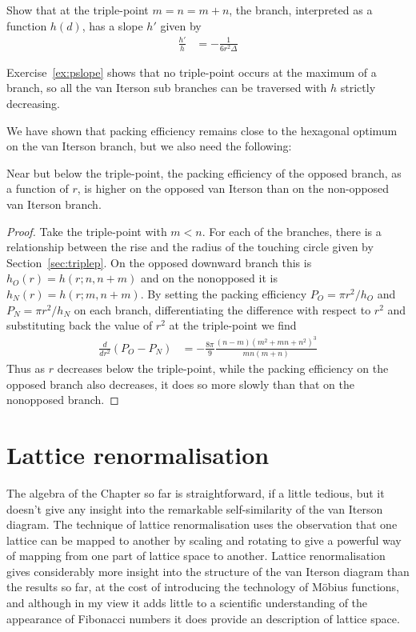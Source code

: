 \begin{jExercise}\label{ex:pslope}
	Show that at the triple-point  $m=n=m+n$, the  branch, interpreted as a function $h(d)$, has a slope $h'$ given by 
	\begin{align}
		\frac{h'}{h} &= - \frac{1}{6 r^2 \Delta}
	\end{align}
\end{jExercise}
Exercise~\ref{ex:pslope} shows that no triple-point occurs at the maximum of a branch, so all the van Iterson sub branches can be traversed with $h$ strictly decreasing. 


We have shown that packing efficiency remains close to the hexagonal optimum on the van Iterson branch, but we also need the following:
\begin{theorem}
	Near but below the triple-point, the packing efficiency of the opposed branch, as a function of $r$, is higher on the opposed van Iterson than on the non-opposed van Iterson branch.
\end{theorem}
\begin{proof}
	Take the triple-point  with $m<n$. For each of the branches, there is a relationship between the rise and the radius of the touching circle given by Section~\ref{sec:triplep}. On the 
	opposed downward branch  this is $h_O(r)= h(r;n,n+m)$ and on the nonopposed   it is $h_N(r)=h(r;m,n+m)$. By setting the 
	packing efficiency  $P_O=\pi r^2/h_O$ and $P_N=\pi r^2/h_N$ on each branch, differentiating the difference with respect to $r^2$ and substituting back the value of $r^2$ at the triple-point we find
	\begin{align}
		\frac{d}{dr^2}(P_O-P_N) &= - \frac{8\pi}{9}\frac{(n- m )  (m^2+m n+n^2)^3}{mn(m+n)}
	\end{align}
	Thus as $r$ decreases below the triple-point, while the packing efficiency on the opposed branch also decreases, it does so more slowly than that on the nonopposed branch.  
\end{proof}




\section{Lattice renormalisation}
\label{sec:renormalisation}
The algebra of the Chapter so far is straightforward, if a little tedious, but it doesn't give any insight into the remarkable self-similarity of the van Iterson diagram. The technique of lattice renormalisation uses the observation that one lattice can be mapped to another by scaling and rotating to give a powerful way of mapping from one part of lattice space to another. Lattice renormalisation gives considerably more insight into the structure of the van Iterson diagram than the results so far, at the cost of introducing the technology of M{\"obius} functions, and although in my view it adds little to a scientific understanding of the appearance of Fibonacci numbers it does provide an   description of lattice space.
\label{sec:levitov}

